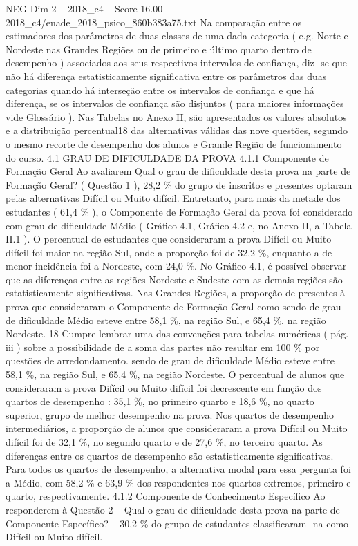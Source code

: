 \begin{textsample}{NEG Dim 2 – 2018\_c4 – Score 16.00 – 2018\_c4/enade\_2018\_psico\_860b383a75.txt}
Na comparação entre os estimadores dos parâmetros de duas classes de uma dada categoria ( e.g.
Norte e Nordeste nas Grandes Regiões ou de primeiro e último quarto dentro de desempenho ) associados aos seus respectivos intervalos de confiança, diz -se que não há diferença estatisticamente significativa entre os parâmetros das duas categorias quando há interseção entre os intervalos de confiança e que há diferença, se os intervalos de confiança são disjuntos ( para maiores informações vide Glossário ).
Nas Tabelas no Anexo II, são apresentados os valores absolutos e a distribuição percentual18 das alternativas válidas das nove questões, segundo o mesmo recorte de desempenho dos alunos e Grande Região de funcionamento do curso. 4.1 GRAU DE DIFICULDADE DA PROVA 4.1.1 Componente de Formação Geral Ao avaliarem Qual o grau de dificuldade desta prova na parte de Formação Geral? ( Questão 1 ), 28,2 \% do grupo de inscritos e presentes optaram pelas alternativas Difícil ou Muito difícil.
Entretanto, para mais da metade dos estudantes ( 61,4 \% ), o Componente de Formação Geral da prova foi considerado com grau de dificuldade Médio ( Gráfico 4.1, Gráfico 4.2 e, no Anexo II, a Tabela II.1 ).
O percentual de estudantes que consideraram a prova Difícil ou Muito difícil foi maior na região Sul, onde a proporção foi de 32,2 \%, enquanto a de menor incidência foi a Nordeste, com 24,0 \%.
No Gráfico 4.1, é possível observar que as diferenças entre as regiões Nordeste e Sudeste com as demais regiões são estatisticamente significativas.
Nas Grandes Regiões, a proporção de presentes à prova que consideraram o Componente de Formação Geral como sendo de grau de dificuldade Médio esteve entre 58,1 \%, na região Sul, e 65,4 \%, na região Nordeste. 18 Cumpre lembrar uma das convenções para tabelas numéricas ( pág. iii ) sobre a possibilidade de a soma das partes não resultar em 100 \% por questões de arredondamento. sendo de grau de dificuldade Médio esteve entre 58,1 \%, na região Sul, e 65,4 \%, na região Nordeste.
O percentual de alunos que consideraram a prova Difícil ou Muito difícil foi decrescente em função dos quartos de desempenho : 35,1 \%, no primeiro quarto e 18,6 \%, no quarto superior, grupo de melhor desempenho na prova.
Nos quartos de desempenho intermediários, a proporção de alunos que consideraram a prova Difícil ou Muito difícil foi de 32,1 \%, no segundo quarto e de 27,6 \%, no terceiro quarto.
As diferenças entre os quartos de desempenho são estatisticamente significativas.
Para todos os quartos de desempenho, a alternativa modal para essa pergunta foi a Médio, com 58,2 \% e 63,9 \% dos respondentes nos quartos extremos, primeiro e quarto, respectivamente. 4.1.2 Componente de Conhecimento Específico Ao responderem à Questão 2 – Qual o grau de dificuldade desta prova na parte de Componente Específico? – 30,2 \% do grupo de estudantes classificaram -na como Difícil ou Muito difícil.

\end{textsample}
